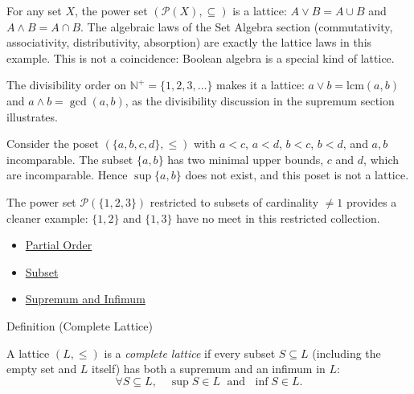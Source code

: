 \begin{remark*}[Examples]
For any set $X$, the power set $(\mathcal{P}(X), \subseteq)$ is a lattice:
$A \vee B = A \cup B$ and $A \wedge B = A \cap B$.  The algebraic laws
of the Set Algebra section (commutativity, associativity, distributivity,
absorption) are exactly the lattice laws in this example.  This is not a
coincidence: Boolean algebra is a special kind of lattice.
\end{remark*}

\begin{remark*}[Examples]
The divisibility order on $\mathbb{N}^+ = \{1, 2, 3, \ldots\}$ makes it a
lattice: $a \vee b = \mathrm{lcm}(a,b)$ and $a \wedge b = \gcd(a,b)$, as
the divisibility discussion in the supremum section illustrates.
\end{remark*}

\begin{remark*}
Consider the poset $(\{a,b,c,d\}, \leq)$ with $a < c$, $a < d$, $b < c$,
$b < d$, and $a,b$ incomparable.  The subset $\{a,b\}$ has two minimal
upper bounds, $c$ and $d$, which are incomparable.  Hence $\sup\{a,b\}$
does not exist, and this poset is not a lattice.

The power set $\mathcal{P}(\{1,2,3\})$ restricted to subsets of cardinality
$\neq 1$ provides a cleaner example: $\{1,2\}$ and $\{1,3\}$ have no meet in
this restricted collection.
\end{remark*}

\begin{dependencies}
\begin{itemize}
  \item \hyperref[def:partial-order]{Partial Order}
  \item \hyperref[def:subset]{Subset}
  \item \hyperref[def:sup-inf]{Supremum and Infimum}
\end{itemize}
\end{dependencies}


\begin{definitionbox}{Definition (Complete Lattice)}
\begin{definition}\label{def:complete-lattice}
A lattice $(L, \leq)$ is a \emph{complete lattice} if every subset
$S \subseteq L$ (including the empty set and $L$ itself) has both a
supremum and an infimum in $L$:
\[
  \forall S \subseteq L,\quad \sup S \in L \;\text{ and }\; \inf S \in L.
\]
\end{definition}
\end{definitionbox}

